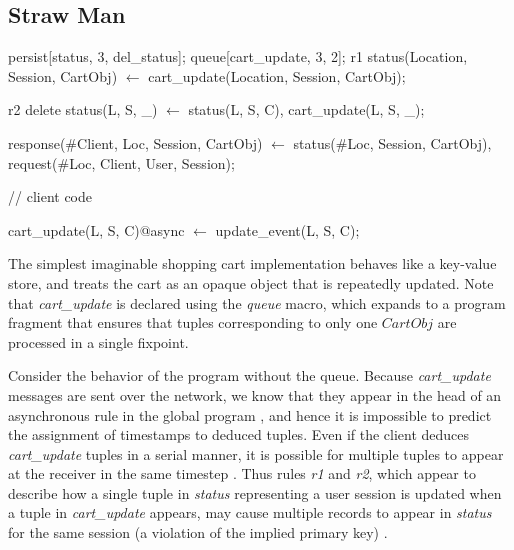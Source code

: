 \subsection{Straw Man}

\begin{Dedalus}
persist[status, 3, del_status];
queue[cart_update, 3, 2];
r1
status(Location, Session, CartObj) \(\leftarrow\)
    cart_update(Location,  Session, CartObj);
    
r2
delete status(L, S, _) \(\leftarrow\)
    status(L, S, C), cart_update(L, S, _);
  
response(#Client, Loc, Session, CartObj) \(\leftarrow\)
    status(#Loc, Session, CartObj),
    request(#Loc, Client, User, Session);

// client code

cart_update(L, S, C)@async \(\leftarrow\) 
    update_event(L, S, C);

\end{Dedalus}

The simplest imaginable shopping cart implementation behaves like a key-value store,
and treats the cart as an opaque object that is repeatedly updated.  Note that 
{\em cart\_update} is declared using the {\em queue} macro, which expands to
a program fragment that ensures that tuples corresponding to only one $CartObj$
are processed in a single fixpoint.

Consider the behavior of the program without the queue.  Because {\em cart\_update}
messages are sent over the network, we know that they appear in the head of an asynchronous 
rule in the global program , and hence it is impossible to predict the assignment of timestamps
to deduced tuples.  Even if the client deduces {\em cart\_update} tuples in a serial manner, it
is possible for multiple tuples to appear at the receiver in the same timestep .  Thus rules {\em r1} 
and {\em r2}, which appear to describe how a single tuple in {\em status} representing a user
session is updated when a tuple in {\em cart\_update} appears, may cause multiple records
to appear in {\em status} for the same session (a violation of the implied primary key) .


